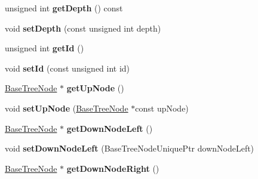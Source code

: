 \begin{DoxyCompactItemize}
\item 
\hypertarget{classffactory_1_1_base_tree_node_af82d12191ce62b7eaad4ef642cbbd324}{unsigned int {\bfseries get\-Depth} () const }\label{classffactory_1_1_base_tree_node_af82d12191ce62b7eaad4ef642cbbd324}

\item 
\hypertarget{classffactory_1_1_base_tree_node_a0960fa1f38afea78e2d651d6b81e847b}{void {\bfseries set\-Depth} (const unsigned int depth)}\label{classffactory_1_1_base_tree_node_a0960fa1f38afea78e2d651d6b81e847b}

\item 
\hypertarget{classffactory_1_1_base_tree_node_a217df7799507516a0e6d739b6cce1879}{unsigned int {\bfseries get\-Id} ()}\label{classffactory_1_1_base_tree_node_a217df7799507516a0e6d739b6cce1879}

\item 
\hypertarget{classffactory_1_1_base_tree_node_a2100a0ca38b922a498a3a32d97128cb7}{void {\bfseries set\-Id} (const unsigned int id)}\label{classffactory_1_1_base_tree_node_a2100a0ca38b922a498a3a32d97128cb7}

\item 
\hypertarget{classffactory_1_1_base_tree_node_af48b4a9254c715ae6c24fdf245ead76e}{\hyperlink{classffactory_1_1_base_tree_node}{Base\-Tree\-Node} $\ast$ {\bfseries get\-Up\-Node} ()}\label{classffactory_1_1_base_tree_node_af48b4a9254c715ae6c24fdf245ead76e}

\item 
\hypertarget{classffactory_1_1_base_tree_node_a852652774f851ac0ed7444177e6ca28b}{void {\bfseries set\-Up\-Node} (\hyperlink{classffactory_1_1_base_tree_node}{Base\-Tree\-Node} $\ast$const up\-Node)}\label{classffactory_1_1_base_tree_node_a852652774f851ac0ed7444177e6ca28b}

\item 
\hypertarget{classffactory_1_1_base_tree_node_a66982055b9accdef826bf004b3508dce}{\hyperlink{classffactory_1_1_base_tree_node}{Base\-Tree\-Node} $\ast$ {\bfseries get\-Down\-Node\-Left} ()}\label{classffactory_1_1_base_tree_node_a66982055b9accdef826bf004b3508dce}

\item 
\hypertarget{classffactory_1_1_base_tree_node_a6eee186634dcec4aa3f818788bd6ba96}{void {\bfseries set\-Down\-Node\-Left} (Base\-Tree\-Node\-Unique\-Ptr down\-Node\-Left)}\label{classffactory_1_1_base_tree_node_a6eee186634dcec4aa3f818788bd6ba96}

\item 
\hypertarget{classffactory_1_1_base_tree_node_a0b7ec999a82040fef492ec0ceb55903f}{\hyperlink{classffactory_1_1_base_tree_node}{Base\-Tree\-Node} $\ast$ {\bfseries get\-Down\-Node\-Right} ()}\label{classffactory_1_1_base_tree_node_a0b7ec999a82040fef492ec0ceb55903f}


\end{DoxyCompactItemize}
